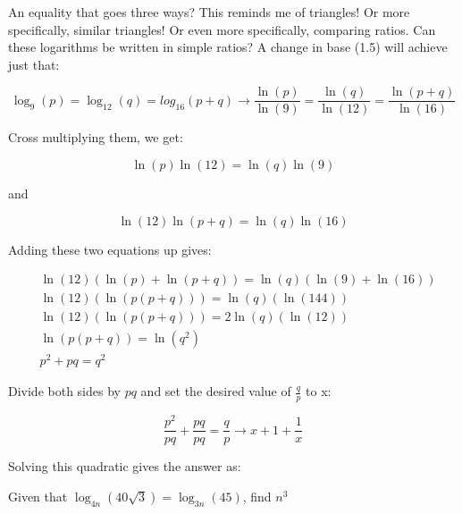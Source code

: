 \begin{solution}

An equality that goes three ways? This reminds me of triangles! Or more specifically, similar triangles! Or even more specifically, comparing ratios. Can these logarithms be written in simple ratios? A change in base (1.5) will achieve just that:

$$
   \log_9(p) = \log_{12}(q) = log_{16}(p+q) \rightarrow
   \frac{\ln(p)}{\ln(9)} = \frac{\ln(q)}{\ln(12)} = \frac{\ln(p+q)}{\ln(16)}
$$

Cross multiplying them, we get:

$$
  \ln(p)\ln(12) = \ln(q)\ln(9)
$$

and

$$
  \ln(12)\ln(p+q) = \ln(q)\ln(16)
$$

Adding these two equations up gives:

\begin{equation*}
  \begin{aligned}
  & \ln(12)(\ln(p)+\ln(p+q)) = \ln(q)(\ln(9)+\ln(16)) \\
  & \ln(12)(\ln(p(p+q))) = \ln(q)(\ln(144)) \\
  & \ln(12)(\ln(p(p+q))) = 2\ln(q)(\ln(12)) \\
  & \ln(p(p+q)) = \ln(q^2) \\
  & p^2 + pq = q^2
  \end{aligned}
\end{equation*}

Divide both sides by $pq$ and set the desired value of $\frac{q}{p}$ to x:

$$
   \frac{p^2}{pq} + \frac{pq}{pq} = \frac{q}{p} \rightarrow x + 1 + \frac{1}{x}
$$

Solving this quadratic gives the answer as: 

\end{solution}


\begin{question}

Given that $\log_{4n}(40\sqrt{3}) = \log_{3n}(45)$, find $n^3$

\end{question}
  
